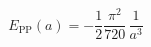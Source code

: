 \begin{equation}
E_{\text{PP}}(a)=-\frac{1}{2} \frac{\pi^2}{720} \, \frac{1}{a^3} 
\label{classic}
\end{equation}

